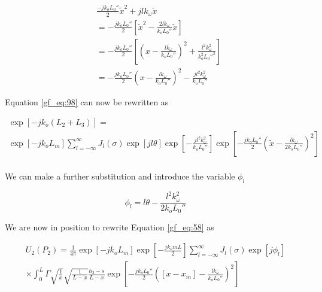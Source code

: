 \begin{equation}
\begin{aligned}
&\frac{-jk_oL_0''}{2}\tilde{x}^2+jlk_{\omega}\tilde{x}\\
&=-\frac{jk_oL_0''}{2}\left[\tilde{x}^2 - \frac{2lk_{\omega}}{k_oL_0''}\tilde{x} \right]\\
&=-\frac{jk_oL_0''}{2}\left[\left(x-\frac{lk_{\omega}}{k_oL_0''} \right)^2 + \frac{l^2k_{\omega}^2}{k_o^2L_0''^2} \right]\\
&=-\frac{jk_oL_0''}{2}\left(x-\frac{lk_{\omega}}{k_oL_0''} \right)^2 - \frac{jl^2k_{\omega}^2}{k_oL_0''} 
\label{gf_eq:99}
\end{aligned}
\end{equation}
\renewcommand{\baselinestretch}{2} \small\normalsize

\noindent Equation \ref{gf_eq:98} can now be rewritten as

\begin{equation}
\begin{gathered}
\exp\left[-jk_o\left( L_2 + L_3\right) \right]= \\
\exp\left[-jk_oL_m\right]\sum_{l=-\infty}^{\infty}J_l(\sigma)\exp\left[jl\theta\right]
\exp\left[- \frac{jl^2k_{\omega}^2}{k_oL_0''} \right]\exp\left[-\frac{jk_oL_0''}{2}\left(\tilde{x}-\frac{lk_{\omega}}{2k_oL_0''} \right)^2\right]\\
\label{gf_eq:100}
\end{gathered}
\end{equation}
\renewcommand{\baselinestretch}{2} \small\normalsize

\noindent We can make a further substitution and introduce the variable $\phi_l$

\begin{equation}
\phi_l = l\theta - \frac{l^2k_{\omega}^2}{2k_oL_0''}
\label{gf_eq:101}
\end{equation}
\renewcommand{\baselinestretch}{2} \small\normalsize

\noindent We are now in position to rewrite Equation \ref{gf_eq:58} as

\begin{equation}
\begin{gathered}
U_2(P_2) = \frac{1}{4\pi} \exp[-jk_oL_m] \exp\left[-\frac{jk_omL}{2}\right]\sum_{l=-\infty}^{\infty}J_l(\sigma)\exp\left[j\phi_l\right] \\
\times \int_0^L  \Gamma \sqrt{\frac{1}{x}}\sqrt{\frac{1}{L-x}}\frac{h_2-s}{L-x}\exp\left[-\frac{jk_oL_0''}{2}\left([x-x_m]-\frac{lk_{\omega}}{k_oL_0''} \right)^2\right]
\label{gf_eq:102}
\end{gathered}
\end{equation}
\renewcommand{\baselinestretch}{2} \small\normalsize

